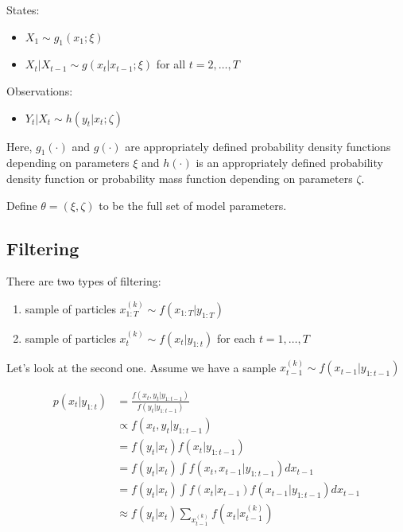 \documentclass[]{article}
\providecommand{\tightlist}{%
  \setlength{\itemsep}{0pt}\setlength{\parskip}{0pt}}
\begin{document}
States:

\begin{itemize}
\item $X_1 \sim g_1(x_1 ; \xi)$
\item $X_t \vert X_{t-1} \sim g(x_t \vert x_{t - 1} ; \xi)$ for all $t = 2, \ldots, T$
\end{itemize}

Observations:

\begin{itemize}
\item $Y_t \vert X_{t} \sim h(y_t | x_t ; \zeta)$
\end{itemize}

Here, \(g_1(\cdot)\) and \(g(\cdot)\) are appropriately defined
probability density functions depending on parameters \(\xi\) and
\(h(\cdot)\) is an appropriately defined probability density function or
probability mass function depending on parameters \(\zeta\).

Define \(\theta = (\xi, \zeta)\) to be the full set of model parameters.

\subsection{Filtering}\label{filtering}

There are two types of filtering:

\begin{enumerate}
\def\labelenumi{\arabic{enumi}.}
\tightlist
\item
  sample of particles \(x_{1:T}^{(k)} \sim f(x_{1:T} | y_{1:T})\)
\item
  sample of particles \(x_{t}^{(k)} \sim f(x_{t} | y_{1:t})\) for each
  \(t = 1, \ldots, T\)
\end{enumerate}

Let's look at the second one. Assume we have a sample
\(x_{t-1}^{(k)} \sim f(x_{t-1} | y_{1:t-1})\)

\begin{align*}
p(x_{t} | y_{1:t}) &= \frac{f(x_t, y_t | y_{1:t-1})}{f(y_t | y_{1:t-1})} \\
 &\propto f(x_t, y_t | y_{1:t-1}) \\
 &= f(y_t | x_t) f(x_t | y_{1:t-1}) \\
 &= f(y_t | x_t) \int f(x_t, x_{t-1} | y_{1:t-1}) d x_{t-1} \\
 &= f(y_t | x_t) \int f(x_t | x_{t - 1}) f(x_{t-1} | y_{1:{t-1}}) dx_{t-1} \\
 &\approx f(y_t | x_t) \sum_{x_{t-1}^{(k)}} f(x_t | x_{t - 1}^{(k)})
\end{align*}
\end{document}
